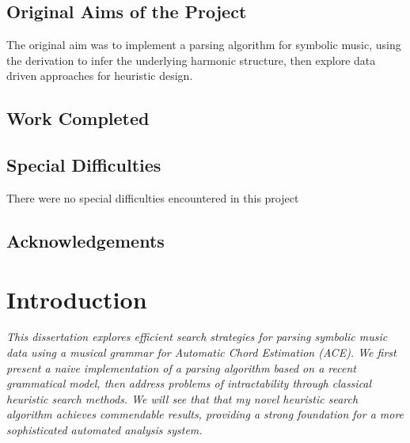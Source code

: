 \documentclass[12pt,a4paper,twoside,openright]{report}
\renewcommand{\baselinestretch}{1.1}    %
\theoremstyle{definition}
\begin{document}

\section*{Original Aims of the Project}
The original aim was to implement a parsing algorithm for symbolic music, using the derivation to infer the underlying harmonic structure, then explore data driven approaches for heuristic design.


\section*{Work Completed}



\section*{Special Difficulties}
There were no special difficulties encountered in this project

\newpage
{
\renewcommand{\baselinestretch}{0.75}\normalsize
\tableofcontents
\renewcommand{\baselinestretch}{1.0}\normalsize
}
\listoffigures

\newpage
\section*{Acknowledgements}




\pagestyle{headings}

\chapter{Introduction}
\textit{This dissertation explores efficient search strategies for parsing symbolic music data using a musical grammar for Automatic Chord Estimation (ACE). We first present a naive implementation of a parsing algorithm based on a recent grammatical model, then address problems of intractability through classical heuristic search methods. We will see that that my novel heuristic search algorithm achieves commendable results, providing a strong foundation for a more sophisticated automated analysis system. }
\end{document}

